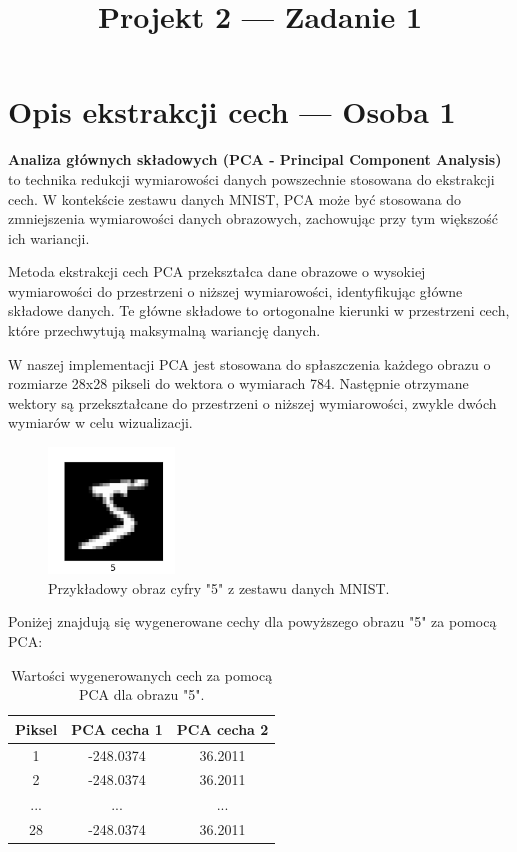 \documentclass[12pt]{article}
\title{Projekt 2 --- Zadanie 1}
\begin{document}
\maketitle
    \section{Opis ekstrakcji cech --- Osoba 1}
    \textbf{Analiza głównych składowych (PCA - Principal Component Analysis)} to technika redukcji wymiarowości danych powszechnie stosowana do ekstrakcji cech. W kontekście zestawu danych MNIST, PCA może być stosowana do zmniejszenia wymiarowości danych obrazowych, zachowując przy tym większość ich wariancji.

    Metoda ekstrakcji cech PCA przekształca dane obrazowe o wysokiej wymiarowości do przestrzeni o niższej wymiarowości, identyfikując główne składowe danych. Te główne składowe to ortogonalne kierunki w przestrzeni cech, które przechwytują maksymalną wariancję danych.

    W naszej implementacji PCA jest stosowana do spłaszczenia każdego obrazu o rozmiarze 28x28 pikseli do wektora o wymiarach 784. Następnie otrzymane wektory są przekształcane do przestrzeni o niższej wymiarowości, zwykle dwóch wymiarów w celu wizualizacji.

    \begin{figure}[h]
        \centering
        \includegraphics[width=0.3\textwidth]{img/MNIST_1_cyfra}
        \caption{Przykładowy obraz cyfry "5" z zestawu danych MNIST.}
    \end{figure}

    Poniżej znajdują się wygenerowane cechy dla powyższego obrazu "5" za pomocą PCA:
\begin{table}[h]
\centering
\begin{tabular}{|c|c|c|}
\hline
\textbf{Piksel} & \textbf{PCA cecha 1} & \textbf{PCA cecha 2} \\
\hline
1 & -248.0374 & 36.2011 \\
2 & -248.0374 & 36.2011 \\
... & ... & ... \\
28 & -248.0374 & 36.2011 \\
\hline
\end{tabular}
\caption{Wartości wygenerowanych cech za pomocą PCA dla obrazu "5".}
\end{table}
\end{document}
